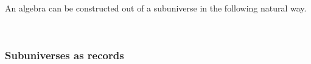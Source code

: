 \ccpad
An algebra can be constructed out of a subuniverse in the following natural way.
\ccpad
\begin{code}%
\>[1]\AgdaSpace{}%
\AgdaSymbol{:}\AgdaSpace{}%
\AgdaSymbol{(}\AgdaSpace{}%
\AgdaSymbol{:}\AgdaSpace{}%
\AgdaSpace{}%
\AgdaSpace{}%
\AgdaSymbol{)(}\AgdaSpace{}%
\AgdaSymbol{:}\AgdaSpace{}%
\AgdaSpace{}%
\AgdaSpace{}%
\AgdaSpace{}%
\AgdaSpace{}%
\AgdaSymbol{)}\AgdaSpace{}%
\AgdaSpace{}%
\AgdaSpace{}%
\AgdaSpace{}%
\AgdaSpace{}%
\AgdaSpace{}%
\AgdaSpace{}%
\AgdaSpace{}%
\AgdaSymbol{(}\AgdaSpace{}%
\AgdaSpace{}%
\AgdaSymbol{)}\AgdaSpace{}%
\<%
\\
%
\>[1]\AgdaSpace{}%
\AgdaSpace{}%
\AgdaSpace{}%
\AgdaSpace{}%
\AgdaSymbol{=}\AgdaSpace{}%
\AgdaSpace{}%
\AgdaSpace{}%
\AgdaOperator{\AgdaInductiveConstructor{,}}\AgdaSpace{}%
\AgdaSpace{}%
\AgdaSpace{}%
\AgdaSpace{}%
\AgdaSpace{}%
\AgdaSymbol{(}\AgdaSpace{}%
\AgdaSpace{}%
\AgdaSymbol{)(}\AgdaSpace{}%
\AgdaSpace{}%
\AgdaSymbol{)}\AgdaSpace{}%
\AgdaOperator{\AgdaInductiveConstructor{,}}\AgdaSpace{}%
\AgdaSpace{}%
\AgdaSpace{}%
\AgdaSymbol{(}\AgdaSpace{}%
\AgdaSpace{}%
\AgdaSymbol{)(}\AgdaSpace{}%
\AgdaSpace{}%
\AgdaSymbol{)}\<%
\end{code}

\subsubsection{Subuniverses as records}\label{subuniverses-as-records}

